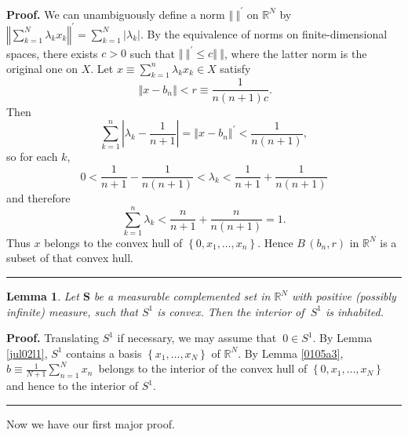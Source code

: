 \documentclass[11pt]{article}%
\newtheorem{lemma}[theorem]{Lemma}
\newenvironment{proof}[1][Proof]{\noindent\textbf{#1.} }{\ \rule{0.5em}{0.5em}}
\begin{document}
\begin{proof}
We can unambiguously define a norm $\left\Vert \ \right\Vert ^{\prime}$ on
$\mathbb{R}^{N}$ by $\left\Vert \sum_{k=1}^{N}\lambda_{k}x_{k}\right\Vert
^{\prime}=\sum_{k=1}^{N}\left\vert \lambda_{k}\right\vert $. By the
equivalence of norms on finite-dimensional spaces, there exists $c>0$ such
that $\left\Vert \ \right\Vert ^{\prime}\leqslant c\left\Vert \ \right\Vert $,
where the latter norm is the original one on $X$. Let $x\equiv\sum_{k=1}%
^{n}\lambda_{k}x_{k}\in X$ satisfy%
\[
\ \left\Vert x-b_{n}\right\Vert <r\equiv\frac{1}{n(n+1)c}.
\]
Then%
\[
\sum_{k=1}^{n}\left\vert \lambda_{k}-\frac{1}{n+1}\right\vert =\left\Vert
x-b_{n}\right\Vert ^{\prime}<\frac{1}{n(n+1)},
\]
so for each $k$,%
\[
0<\frac{1}{n+1}-\frac{1}{n(n+1)}<\lambda_{k}<\frac{1}{n+1}+\frac{1}{n(n+1)}%
\]
and therefore%
\[
\sum_{k=1}^{n}\lambda_{k}<\frac{n}{n+1}+\frac{n}{n(n+1)}=1.
\]
Thus $x$ belongs to the convex hull of $\left\{  0,x_{1},\ldots,x_{n}\right\}
$. Hence $B\,(b_{n},r)$ in $\mathbb{R}^{N}$ is a subset of that convex hull.
\end{proof}

\begin{lemma}
\label{jul17l1}Let $\mathbf{S}$ be a measurable complemented set in
$\mathbb{R}^{N}$ with positive (possibly infinite) measure, such that $S^{1}$
is convex. Then the interior of $\ S^{1}$ is inhabited.
\end{lemma}

\begin{proof}
Translating $S^{1}$ if necessary, we may assume that\textbf{\ }$0\in S^{1}$.
By Lemma \ref{jul02l1}, $S^{1}$ contains a basis $\left\{  x_{1},\ldots
,x_{N}\right\}  $ of $\mathbb{R}^{N}$. By Lemma \ref{0105a3}, $b\equiv\frac
{1}{N+1}\sum_{n=1}^{N}x_{n}$\ belongs to the interior of the convex hull of
$\left\{  0,x_{1},\ldots,x_{N}\right\}  $ and hence to the interior of $S^{1}$.
\end{proof}

%

\medskip


Now we have our first major proof.%

\medskip
\end{document}
